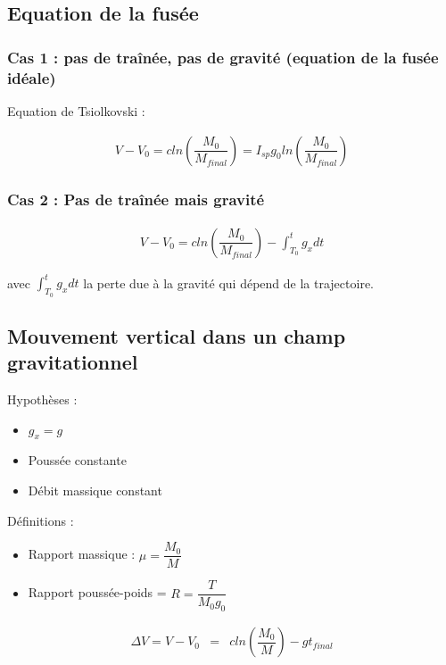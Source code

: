 \documentclass{report}
\begin{document}
\subsection{Equation de la fusée}

\subsubsection{Cas 1 : pas de traînée, pas de gravité (equation de la fusée idéale)}

Equation de Tsiolkovski :

\begin{eqnarray}
\boxed{V-V_0=c ln\left(\dfrac{M_0}{M_{final}}\right)=I_{sp} g_0 ln\left(\dfrac{M_0}{M_{final}}\right)}
\end{eqnarray}

\subsubsection{Cas 2 : Pas de traînée mais gravité}

\begin{eqnarray}
\boxed{V-V_0=c ln\left(\dfrac{M_0}{M_{final}}\right) - \int_{T_0}^{t}g_x dt}
\end{eqnarray}

avec $\int_{T_0}^{t}g_x dt$ la perte due à la gravité qui dépend de la trajectoire.

\subsection{Mouvement vertical dans un champ gravitationnel}

Hypothèses :

\begin{itemize}
    \item $g_x=g$
    \item Poussée constante
    \item Débit massique constant
\end{itemize}

Définitions : 

\begin{itemize}
    \item Rapport massique : $\mu=\dfrac{M_0}{M}$
    \item Rapport poussée-poids = $R=\dfrac{T}{M_0 g_0}$
\end{itemize}

\begin{eqnarray}
\Delta V = V-V_0 &= & c ln\left(\dfrac{M_0}{M}\right)-g t_{final}
\end{eqnarray}
\end{document}
